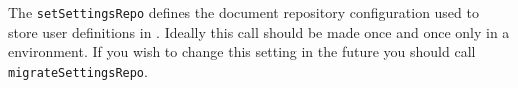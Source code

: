 The \verb+setSettingsRepo+ defines the document repository configuration used to store user definitions
in \Rapture. Ideally this call should be made once and once only in a \Rapture environment. If you wish to
change this setting in the future you should call \verb+migrateSettingsRepo+.
